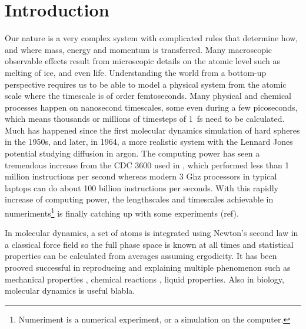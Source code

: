 \documentclass[aps,pre,twocolumn,letterpaper,floatfix,nofootinbib]{revtex4}
\begin{document}
\section{Introduction}
Our nature is a very complex system with complicated rules that determine how, and where mass, energy and momentum is transferred.
Many macroscopic observable effects result from microscopic details on the atomic level such as melting of ice, and even life.
Understanding the world from a bottom-up perspective requires us to be able to model a physical system from the atomic scale where the timescale is of order femtoseconds.
Many physical and chemical processes happen on nanosecond timescales, some even during a few picoseconds, which means thousands or millions of timesteps of \SI{1}{\femto\second} need to be calculated.
Much has happened since the first molecular dynamics simulation of hard spheres in the 1950s\citep{alder1957phase,alder1959studies}, and later, in 1964, a more realistic system with the Lennard Jones potential studying diffusion in argon\citep{rahman1964correlations}.
The computing power has seen a tremendous increase from the CDC 3600 used in \citep{rahman1964correlations}, which performed less than 1 million instructions per second whereas modern 3 Ghz processors in typical laptops can do about 100 billion instructions per seconds.
With this rapidly increase of computing power, the lengthscales and timescales achievable in numeriments\footnote{Numeriment is a numerical experiment, or a simulation on the computer.} is finally catching up with some experiments (ref).

In molecular dynamics, a set of atoms is integrated using Newton's second law in a classical force field so the full phase space is known at all times and statistical properties can be calculated from averages assuming ergodicity.
It has been prooved successful in reproducing and explaining multiple phenomenon such as mechanical properties \citep{jiang2009young, campbell1999structural, ning2012mechanical}, chemical reactions \citep{van2001reaxff, brenner2002second}, liquid properties\citep{allen2017computer}.
Also in biology, molecular dynamics is useful blabla.
\end{document}
